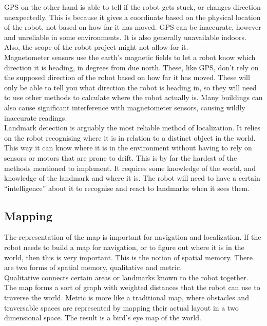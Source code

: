 \documentclass[12pt]{article}
\begin{document}
GPS on the other hand is able to tell if the robot gets stuck, or changes direction unexpectedly. This is because it gives a coordinate based on the physical location of the robot, not based on how far it has moved. GPS can be inaccurate, however and unreliable in some environments. It is also generally unavailable indoors. Also, the scope of the robot project might not allow for it.\\

Magnetometer sensors use the earth’s magnetic fields to let a robot know which direction it is heading, in degrees from due north. These, like GPS, don’t rely on the supposed direction of the robot based on how far it has moved. These will only be able to tell you what direction the robot is heading in, so they will need to use other methods to calculate where the robot actually is. Many buildings can also cause significant interference with magnetometer sensors, causing wildly inaccurate readings.\\

Landmark detection is arguably the most reliable method of localization. It relies on the robot recognising where it is in relation to a distinct object in the world. This way it can know where it is in the environment without having to rely on sensors or motors that are prone to drift. This is by far the hardest of the methods mentioned to implement. It requires some knowledge of the world, and knowledge of the landmark and where it is. The robot will need to have a certain “intelligence” about it to recognise and react to landmarks when it sees them.


	\subsection{Mapping}
The representation of the map is important for navigation and localization. If the robot needs to build a map for navigation, or to figure out where it is in the world, then this is very important. This is the notion of spatial memory. There are two forms of spatial memory, qualitative and metric.
\\
Qualitative connects certain areas or landmarks known to the robot together. The map forms a sort of graph with weighted distances that the robot can use to traverse the world. Metric is more like a traditional map, where obstacles and traversable spaces are represented by mapping their actual layout in a two dimensional space. The result is a bird’s eye map of the world. 
\end{document}
